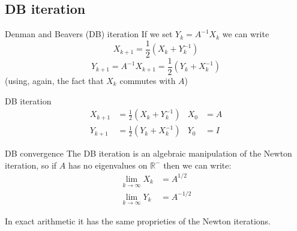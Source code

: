 \documentclass{beamer}
\theoremstyle{plain}
\theoremstyle{definition}
\theoremstyle{remark}
\newcommand{\pa}[1]{\left(#1\right)}
\DeclareMathOperator{\sign}{sign}
\begin{document}

  


\subsection{DB iteration}

\begin{frame}{Denman and Beavers (DB) iteration}
  If we set $Y_k = A^{-1} X_k$ we can write
  \[ X_{k+1} = \frac{1}{2}\pa{X_k + Y_k ^{-1}} \]
  \[ Y_{k+1} = A^{-1} X_{k+1} = \frac{1}{2}\pa{ Y_k + X_k^{-1}} \]
  (using, again, the fact that $X_k$ commutes with $A$)

  \begin{block}{DB iteration}
    \begin{align*}
      X_{k+1} &= \frac{1}{2} \pa{ X_k + Y_k ^{-1}} & X_0 &= A \\
      Y_{k+1} &= \frac{1}{2} \pa{ Y_k + X_k ^{-1}} & Y_0 &= I 
    \end{align*}
  \end{block}
\end{frame}

\begin{frame}{DB convergence}
  The DB iteration is an algebraic manipulation of the Newton
  iteration, so if $A$ has no eigenvalues on $\mathbb{R}^-$ then we
  can write:
  \begin{align*}
    \lim _{k \to \infty} X_k &= A^{1/2} \\
    \lim _{k\to \infty} Y_k &= A^{-1/2}
  \end{align*}
  \vfill

  In exact arithmetic it has the same proprieties of the Newton
  iterations.
\end{frame}
\end{document}
